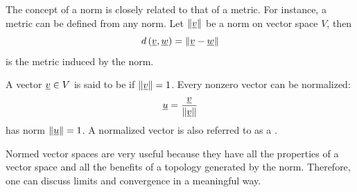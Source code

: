 The concept of a norm is closely related to that of a metric.
For instance, a metric can be defined from any norm.
Let $\left\| \underline{v} \right\|$ be a norm on vector space $V$, then
\begin{equation*}
d \left( \underline{v}, \underline{w} \right)
= \left\| \underline{v} - \underline{w} \right\|
\end{equation*}
is the metric induced by the norm.

\begin{definition}
A vector $\underline{v} \in V$ is said to be  if $\left\| \underline{v} \right\| = 1$.
Every nonzero vector can be normalized:
\begin{equation}
\underline{u} = \frac{\underline{v}}{\left\| \underline{v} \right\|}
\end{equation}
has norm $\left\| \underline{u} \right\| = 1$.
A normalized vector is also referred to as a .
\end{definition}

Normed vector spaces are very useful because they have all the properties of a vector space and all the benefits of a topology generated by the norm.
Therefore, one can discuss limits and convergence in a meaningful way.


